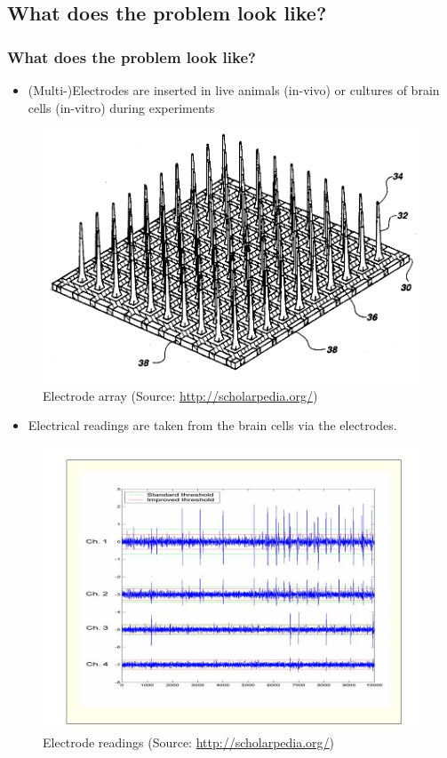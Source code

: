 \documentclass[11pt]{beamer}
\begin{document}
	\begin{frame}
		\section{What does the problem look like?}
		\frametitle{What does the problem look like?}
		\begin{itemize}
			\item (Multi-)Electrodes are inserted in live animals (in-vivo) or cultures of brain cells (in-vitro) during experiments
		\end{itemize}
		\begin{figure}[p]
			\centering
			\includegraphics[scale=0.4]{images/Utah_array_pat5215088.jpg}
			\caption{Electrode array (Source: \url{http://scholarpedia.org/})}
		\end{figure}
	\end{frame}
	\begin{frame}
		\begin{itemize}
			\item Electrical readings are taken from the brain cells via the electrodes.
		\end{itemize}
		\begin{figure}[p]
			\centering
			\includegraphics[scale=0.25]{images/QQ_Fig6.jpg}
			\caption{Electrode readings (Source: \url{http://scholarpedia.org/})}
		\end{figure}
	\end{frame}
\end{document}
